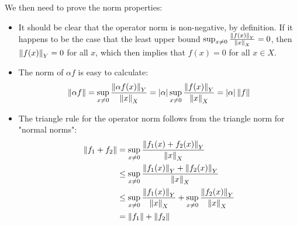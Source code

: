 We then need to prove the norm properties:
\begin{itemize}
    \item It should be clear that the operator norm is non-negative, by definition. If it happens to be the case that the least upper bound \mbox{$\sup_{x\neq 0}\frac{\left\lVert f(x) \right\rVert_{Y}}{\left\lVert x \right\rVert_{X}} = 0$}, then \mbox{$\left\lVert f(x) \right\rVert_{Y} = 0$} for all $x$, which then implies that \mbox{$f(x) = 0$} for all $x\in X$.
    \item The norm of $\alpha f$ is easy to calculate:
    \[ \left\lVert \alpha f \right\rVert = \sup_{x\neq 0} \frac{\left\lVert \alpha f(x) \right\rVert_{Y}}{\left\lVert x \right\rVert_{X}} = |\alpha| \sup_{x\neq 0} \frac{\left\lVert f(x) \right\rVert_{Y}}{\left\lVert x \right\rVert_{X}} = |\alpha|\left\lVert f \right\rVert \]
    \item The triangle rule for the operator norm follows from the triangle norm for "normal norms":
    \begin{equation}
        \begin{split}
            \left\lVert f_{1} + f_{2} \right\rVert &= \sup_{x\neq 0} \frac{\left\lVert f_{1}(x) + f_{2}(x) \right\rVert_{Y}}{\left\lVert x \right\rVert_{X}} \\
            &\leq \sup_{x\neq 0} \frac{\left\lVert f_{1}(x) \right\rVert_{Y} + \left\lVert f_{2}(x) \right\rVert_{Y}}{\left\lVert x \right\rVert_{X}} \\
            &\leq \sup_{x\neq 0} \frac{\left\lVert f_{1}(x) \right\rVert_{Y}}{\left\lVert x \right\rVert_{X}} + \sup_{x\neq 0} \frac{\left\lVert f_{2}(x) \right\rVert_{Y}}{\left\lVert x \right\rVert_{X}} \\
            &= \left\lVert f_{1} \right\rVert + \left\lVert f_{2} \right\rVert
        \end{split}
    \end{equation}
\end{itemize}

